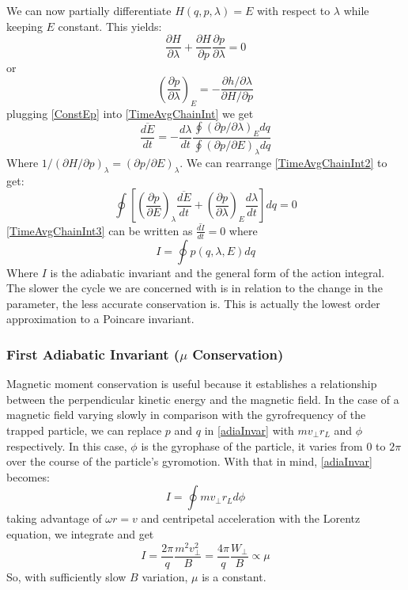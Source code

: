 \documentclass[12pt]{article}
\begin{document}
We can now partially differentiate $H(q,p,\lambda)=E$ with respect to $\lambda$ while keeping $E$ constant. This yields:
$$\frac{\partial H}{\partial \lambda}+\frac{\partial H}{\partial p}\frac{\partial p}{\partial \lambda}=0$$
or
\begin{equation}\label{ConstEp}
\left(\frac{\partial p}{\partial \lambda}\right)_E=-\frac{\partial h/\partial\lambda}{\partial H/\partial p}
\end{equation}  
plugging \eqref{ConstEp} into \eqref{TimeAvgChainInt} we get
\begin{equation}\label{TimeAvgChainInt2}
\overline{\frac{dE}{dt}}=-\frac{d\lambda}{dt}\frac{\oint (\partial p/\partial\lambda)_Edq}{\oint(\partial p/\partial E)_{\lambda}dq}
\end{equation}
Where $1/(\partial H/\partial p)_{\lambda}=(\partial p/\partial E)_{\lambda}$. We can rearrange \eqref{TimeAvgChainInt2} to get:
\begin{equation}\label{TimeAvgChainInt3}
\oint\left[ \left(\frac{\partial p}{\partial E}\right)_{\lambda}\overline{\frac{dE}{dt}}+\left(\frac{\partial p}{\partial \lambda}\right)_E\frac{d\lambda}{dt}\right]dq=0
\end{equation}
\eqref{TimeAvgChainInt3} can be written as $\overline{\frac{dI}{dt}}=0$ where
\begin{equation}\label{adiaInvar}
I=\oint p(q,\lambda,E)dq
\end{equation}
Where $I$ is the adiabatic invariant and the general form of the action integral. The slower the cycle we are concerned with is in relation to the change in the parameter, the less accurate conservation is. This is actually the lowest order approximation to a Poincare invariant. 
\subsubsection{First Adiabatic Invariant ($\mu$ Conservation)}\label{subsecfiradia}
Magnetic moment conservation is useful because it establishes a relationship between the perpendicular kinetic energy and the magnetic field. In the case of a magnetic field varying slowly in comparison with the gyrofrequency of the trapped particle, we can replace $p$ and $q$ in \eqref{adiaInvar} with $mv_{\perp}r_L$ and $\phi$ respectively. In this case, $\phi$ is the gyrophase of the particle, it varies from $0$ to $2\pi$ over the course of the particle's gyromotion. With that in mind, \eqref{adiaInvar} becomes:
\begin{equation}\label{gyroint}
I=\oint mv_{\perp}r_Ld\phi
\end{equation}
taking advantage of $\omega r=v$ and centripetal acceleration with the Lorentz equation, we integrate and get
\begin{equation}\label{firstadia}
I=\frac{2\pi}{q}\frac{m^2v_{\perp}^2}{B}=\frac{4\pi}{q}\frac{W_{\perp}}{B}\propto\mu
\end{equation}
So, with sufficiently slow $B$ variation, $\mu$ is a constant. 
\end{document}
